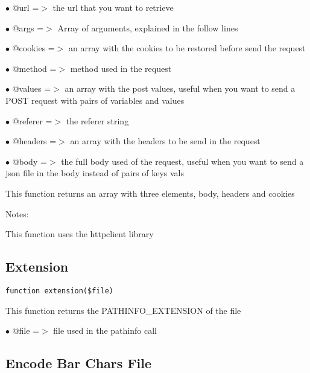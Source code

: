 \documentclass[a4paper]{book}
\begin{document}
\begin{compactitem}
\item[\color{myblue}$\bullet$] @url     =$>$ the url that you want to retrieve
\item[\color{myblue}$\bullet$] @args    =$>$ Array of arguments, explained in the follow lines
\item[\color{myblue}$\bullet$] @cookies =$>$ an array with the cookies to be restored before send the request
\item[\color{myblue}$\bullet$] @method  =$>$ method used in the request
\item[\color{myblue}$\bullet$] @values  =$>$ an array with the post values, useful when you want to send a POST
            request with pairs of variables and values
\item[\color{myblue}$\bullet$] @referer =$>$ the referer string
\item[\color{myblue}$\bullet$] @headers =$>$ an array with the headers to be send in the request
\item[\color{myblue}$\bullet$] @body    =$>$ the full body used of the request, useful when you want to send a
            json file in the body instead of pairs of keys vals
\end{compactitem}

This function returns an array with three elements, body, headers and cookies

Notes:

This function uses the httpclient library

\hypertarget{toc134}{}
\subsection{Extension}

\begin{lstlisting}
function extension($file)
\end{lstlisting}

This function returns the PATHINFO\_EXTENSION of the file

\begin{compactitem}
\item[\color{myblue}$\bullet$] @file =$>$ file used in the pathinfo call
\end{compactitem}

\hypertarget{toc135}{}
\subsection{Encode Bar Chars File}
\end{document}
